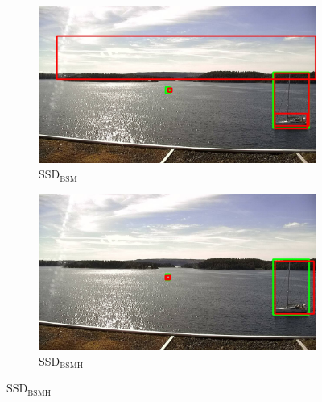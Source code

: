 \begin{figure}
\begin{subfigure}{.5\textwidth}
  \centering
  \includegraphics[width=0.9\linewidth]{results/case_buildings/bigbox_bcbf/SSD2/selected_08_07_frame2176.jpg}
  \caption{SSD$_{\text{BSM}}$}
  \label{fig:sfig1}
\end{subfigure}%
\begin{subfigure}{.5\textwidth}
  \centering
  \includegraphics[width=.9\linewidth]{results/case_buildings/bigbox_bcbf/SSD3/selected_08_07_frame2176.jpg}
  \caption{SSD$_{\text{BSMH}}$}
  \label{fig:sfig2}
\end{subfigure}


\end{figure}
